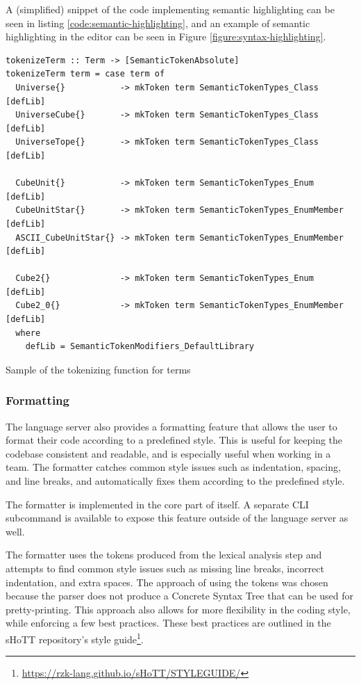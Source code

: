 A (simplified) snippet of the code implementing semantic highlighting can be seen in listing \ref{code:semantic-highlighting},
and an example of semantic highlighting in the editor can be seen in Figure \ref{figure:syntax-highlighting}.

\begin{listing}
  \begin{verbatim}
tokenizeTerm :: Term -> [SemanticTokenAbsolute]
tokenizeTerm term = case term of
  Universe{}           -> mkToken term SemanticTokenTypes_Class [defLib]
  UniverseCube{}       -> mkToken term SemanticTokenTypes_Class [defLib]
  UniverseTope{}       -> mkToken term SemanticTokenTypes_Class [defLib]

  CubeUnit{}           -> mkToken term SemanticTokenTypes_Enum [defLib]
  CubeUnitStar{}       -> mkToken term SemanticTokenTypes_EnumMember [defLib]
  ASCII_CubeUnitStar{} -> mkToken term SemanticTokenTypes_EnumMember [defLib]

  Cube2{}              -> mkToken term SemanticTokenTypes_Enum [defLib]
  Cube2_0{}            -> mkToken term SemanticTokenTypes_EnumMember [defLib]
  where
    defLib = SemanticTokenModifiers_DefaultLibrary
  \end{verbatim}
  \caption{Sample of the tokenizing function for terms}
  \label{code:semantic-highlighting}
\end{listing}

\subsubsection{Formatting}

The language server also provides a formatting feature that allows the user to format their code according to a predefined style.
This is useful for keeping the codebase consistent and readable, and is especially useful when working in a team.
The formatter catches common style issues such as indentation, spacing, and line breaks,
and automatically fixes them according to the predefined style.

The formatter is implemented in the core part of \Rzk{} itself.
A separate CLI subcommand is available to expose this feature outside of the language server as well.

The formatter uses the tokens produced from the lexical analysis step and attempts to find
common style issues such as missing line breaks, incorrect indentation, and extra spaces.
The approach of using the tokens was chosen because the parser does not produce a Concrete Syntax Tree
that can be used for pretty-printing.
This approach also allows for more flexibility in the coding style, while enforcing a few best practices.
These best practices are outlined in the sHoTT repository's style guide\footnote{
  \url{https://rzk-lang.github.io/sHoTT/STYLEGUIDE/}}.

